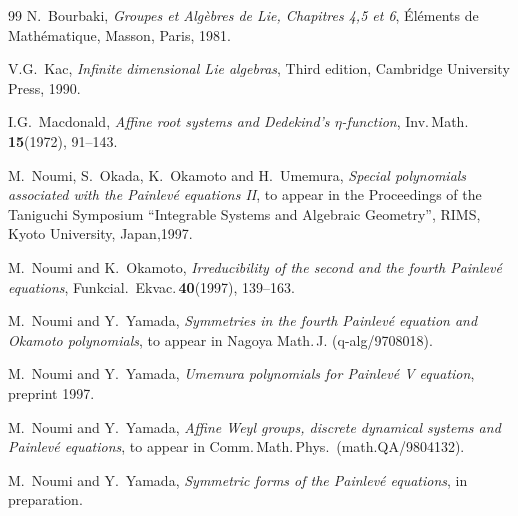 \begin{thebibliography}{99}
 N.~Bourbaki, {\em Groupes et Alg\`ebres de Lie, Chapitres 4,5 et 6},
\'El\'ements de Math\'ematique, Masson, Paris, 1981. 

 V.G.~Kac, {\em Infinite dimensional Lie algebras}, Third edition, 
Cambridge University Press, 1990.



 I.G.~Macdonald, {\em Affine root systems and Dedekind's $\eta$-function},
Inv.\,Math.\,{\bf 15}(1972), 91--143.


 M.~Noumi, S.~Okada, K.~Okamoto and H.~Umemura, 
{\em Special polynomials associated with the Painlev\'e equations II},
to appear in the Proceedings of the Taniguchi Symposium
``Integrable Systems and Algebraic Geometry'', 
RIMS, Kyoto University, Japan,1997.

 M.~Noumi and K.~Okamoto,
{\em Irreducibility of the second and the fourth Painlev\'e equations},
Funkcial.\, Ekvac.\,{\bf 40}(1997), 139--163. 

 M.~Noumi and Y.~Yamada, 
{\em Symmetries in the fourth Painlev\'e equation and Okamoto polynomials}, 
to appear in Nagoya Math.\,J. (q-alg/9708018).

 M.~Noumi and Y.~Yamada, 
{\em Umemura polynomials for Painlev\'e  V equation}, preprint 1997. 

 M.~Noumi and Y.~Yamada, 
{\em Affine Weyl groups, discrete dynamical systems and Painlev\'e equations}, 
to appear in Comm.\,Math.\,Phys.\, (math.QA/9804132). 


 M.~Noumi and Y.~Yamada, 
{\em Symmetric forms of the Painlev\'e equations}, 
in preparation.  


\end{thebibliography}
